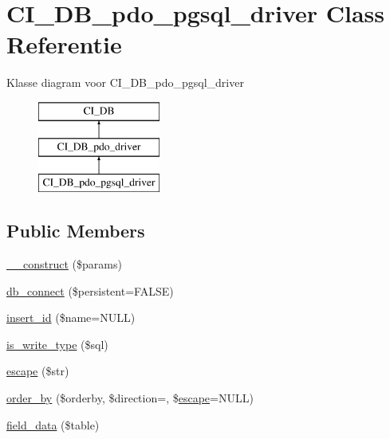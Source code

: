 \hypertarget{class_c_i___d_b__pdo__pgsql__driver}{}\section{C\+I\+\_\+\+D\+B\+\_\+pdo\+\_\+pgsql\+\_\+driver Class Referentie}
\label{class_c_i___d_b__pdo__pgsql__driver}
Klasse diagram voor C\+I\+\_\+\+D\+B\+\_\+pdo\+\_\+pgsql\+\_\+driver\begin{figure}[H]
\begin{center}
\leavevmode
\includegraphics[height=3.000000cm]{class_c_i___d_b__pdo__pgsql__driver}
\end{center}
\end{figure}
\subsection*{Public Members}
\begin{DoxyCompactItemize}
\item 
\mbox{\hyperlink{class_c_i___d_b__pdo__pgsql__driver_a9162320adff1a1a4afd7f2372f753a3e}{\+\_\+\+\_\+construct}} (\$params)
\item 
\mbox{\hyperlink{class_c_i___d_b__pdo__pgsql__driver_a52bf595e79e96cc0a7c907a9b45aeb4d}{db\+\_\+connect}} (\$persistent=F\+A\+L\+SE)
\item 
\mbox{\hyperlink{class_c_i___d_b__pdo__pgsql__driver_ae61dc2c85e5516f143f6246c686bc3fc}{insert\+\_\+id}} (\$name=N\+U\+LL)
\item 
\mbox{\hyperlink{class_c_i___d_b__pdo__pgsql__driver_af435df5703c238769d6d16fde6d51182}{is\+\_\+write\+\_\+type}} (\$sql)
\item 
\mbox{\hyperlink{class_c_i___d_b__pdo__pgsql__driver_ac8f37ca5703d4558c732e692194f8cd6}{escape}} (\$str)
\item 
\mbox{\hyperlink{class_c_i___d_b__pdo__pgsql__driver_a6d1ce6a3b22187165ce7d710ce91841d}{order\+\_\+by}} (\$orderby, \$direction=\textquotesingle{}\textquotesingle{}, \$\mbox{\hyperlink{class_c_i___d_b__pdo__pgsql__driver_ac8f37ca5703d4558c732e692194f8cd6}{escape}}=N\+U\+LL)
\item 
\mbox{\hyperlink{class_c_i___d_b__pdo__pgsql__driver_a90355121e1ed009e0efdbd544ab56efa}{field\+\_\+data}} (\$table)
\end{DoxyCompactItemize}
